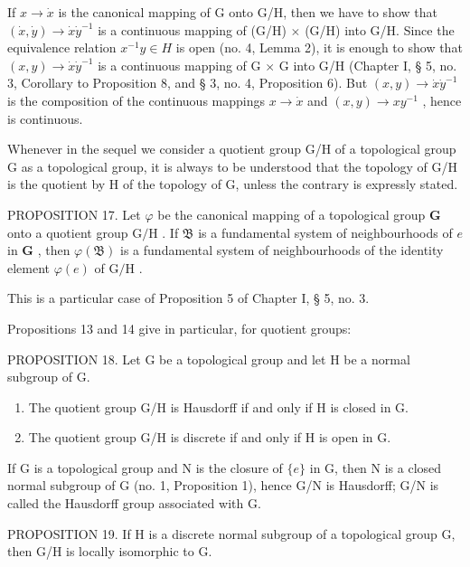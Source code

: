 If \(x \to \dot{x}\) is the canonical mapping of G onto G/H, then we have to show that \((\dot{x}, \dot{y}) \to \dot{x}\dot{y}^{-1}\) is a continuous mapping of (G/H) \(\times\) (G/H) into G/H. Since the equivalence relation \(x^{-1}y \in H\) is open (no. 4, Lemma 2), it is enough to show that \((x,y) \to \dot{x}\dot{y}^{-1}\) is a continuous mapping of G \(\times\) G into G/H (Chapter I, § 5, no. 3, Corollary to Proposition 8, and § 3, no. 4, Proposition 6). But \((x,y) \to \dot{x}\dot{y}^{-1}\) is the composition of the continuous mappings \(x \to \dot{x}\) and \((x,y) \to xy^{-1}\) , hence is continuous.

Whenever in the sequel we consider a quotient group G/H of a topological group G as a topological group, it is always to be understood that the topology of G/H is the quotient by H of the topology of G, unless the contrary is expressly stated.

PROPOSITION 17. Let \(\varphi\) be the canonical mapping of a topological group \(\mathbf{G}\) onto a quotient group \(\mathrm{G / H}\) . If \(\mathfrak{B}\) is a fundamental system of neighbourhoods of \(e\) in \(\mathbf{G}\) , then \(\varphi(\mathfrak{B})\) is a fundamental system of neighbourhoods of the identity element \(\varphi(e)\) of \(\mathrm{G / H}\) .

This is a particular case of Proposition 5 of Chapter I, § 5, no. 3.

Propositions 13 and 14 give in particular, for quotient groups:

PROPOSITION 18. Let G be a topological group and let H be a normal subgroup of G.

\begin{enumerate}
\def\labelenumi{\alph{enumi})}
\item
  The quotient group G/H is Hausdorff if and only if H is closed in G.
\item
  The quotient group G/H is discrete if and only if H is open in G.
\end{enumerate}

If G is a topological group and N is the closure of \(\{e\}\) in G, then N is a closed normal subgroup of G (no. 1, Proposition 1), hence G/N is Hausdorff; G/N is called the Hausdorff group associated with G.

PROPOSITION 19. If H is a discrete normal subgroup of a topological group G, then G/H is locally isomorphic to G.

